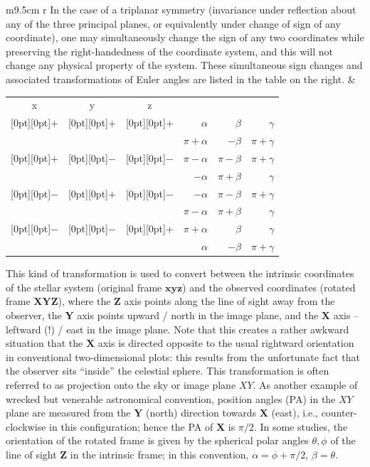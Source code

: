 \documentclass[12pt]{article}
\newcommand{\bx}{\boldsymbol{x}}
\newcommand{\by}{\boldsymbol{y}}
\newcommand{\bz}{\boldsymbol{z}}
\newcommand{\bX}{\boldsymbol{X}}
\newcommand{\bY}{\boldsymbol{Y}}
\newcommand{\bZ}{\boldsymbol{Z}}
\begin{document}
\makebox[-2mm]{}\begin{tabular}{m{9.5cm} r}
In the case of a triplanar symmetry (invariance under reflection about any of the three principal planes, or equivalently under change of sign of any coordinate), one may simultaneously change the sign of any two coordinates while preserving the right-handedness of the coordinate system, and this will not change any physical property of the system. These simultaneous sign changes and associated transformations of Euler angles are listed in the table on the right.
&
\begin{tabular}{c c c r r r}
x & y & z & & \makebox[0pt][r]{angles} \\
\raisebox{-8pt}[0pt][0pt]{$+$} & \raisebox{-8pt}[0pt][0pt]{$+$} & \raisebox{-8pt}[0pt][0pt]{$+$}
&   $\alpha$ & $\beta$ & $\gamma$ \\
&&& $\pi+\alpha$ & $-\beta$ & $\pi+\gamma$ \\
\raisebox{-8pt}[0pt][0pt]{$+$} & \raisebox{-8pt}[0pt][0pt]{$-$} & \raisebox{-8pt}[0pt][0pt]{$-$}
&   $\pi-\alpha$ & $\pi-\beta$ & $\pi+\gamma$ \\
&&& $-\alpha$ & $\pi+\beta$ & $\gamma$ \\
\raisebox{-8pt}[0pt][0pt]{$-$} & \raisebox{-8pt}[0pt][0pt]{$+$} & \raisebox{-8pt}[0pt][0pt]{$-$}
&   $-\alpha$ & $\pi-\beta$ & $\pi+\gamma$ \\
&&& $\pi-\alpha$ & $\pi+\beta$ & $\gamma$ \\
\raisebox{-8pt}[0pt][0pt]{$-$} & \raisebox{-8pt}[0pt][0pt]{$-$} & \raisebox{-8pt}[0pt][0pt]{$+$}
&   $\pi+\alpha$ & $\beta$ & $\gamma$ \\
&&& $\alpha$ & $-\beta$ & $\pi+\gamma$
\end{tabular}
\end{tabular}

This kind of transformation is used to convert between the intrinsic coordinates of the stellar system (original frame $\bx\by\bz$) and the observed coordinates (rotated frame $\bX\bY\bZ$), where the $\bZ$ axis points along the line of sight away from the observer, the $\bY$ axis points upward / north in the image plane, and the $\bX$ axis -- leftward (!) / east in the image plane.
Note that this creates a rather awkward situation that the $\bX$ axis is directed opposite to the usual rightward orientation in conventional two-dimensional plots: this results from the unfortunate fact that the observer sits ``inside'' the celestial sphere. This transformation is often referred to as projection onto the sky or image plane $XY$. As another example of wrecked but venerable astronomical convention, position angles (PA) in the $XY$ plane are measured from the $\bY$ (north) direction towards $\bX$ (east), i.e., counter-clockwise in this configuration; hence the PA of $\bX$ is $\pi/2$.
In some studies, the orientation of the rotated frame is given by the spherical polar angles $\theta,\phi$ of the line of sight $\bZ$ in the intrinsic frame; in this convention, $\alpha=\phi+\pi/2$, $\beta=\theta$.
\end{document}
